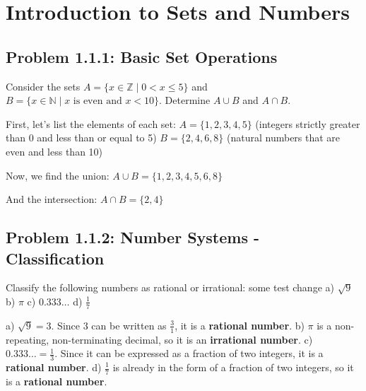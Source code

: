 
\section{Introduction to Sets and Numbers} %

\subsection*{Problem 1.1.1: Basic Set Operations}
Consider the sets $A = \{x \in \mathbb{Z} \mid 0 < x \le 5\}$ and $B = \{x \in \mathbb{N} \mid x \text{ is even and } x < 10\}$.
Determine $A \cup B$ and $A \cap B$.

\begin{solution}
First, let's list the elements of each set:
$A = \{1, 2, 3, 4, 5\}$ (integers strictly greater than 0 and less than or equal to 5)
$B = \{2, 4, 6, 8\}$ (natural numbers that are even and less than 10)

Now, we find the union:
$A \cup B = \{1, 2, 3, 4, 5, 6, 8\}$

And the intersection:
$A \cap B = \{2, 4\}$
\end{solution}

\subsection*{Problem 1.1.2: Number Systems - Classification}
Classify the following numbers as rational or irrational: some test change
a) $\sqrt{9}$
b) $\pi$
c) $0.333\dots$
d) $\frac{1}{7}$

\begin{solution}
a) $\sqrt{9} = 3$. Since $3$ can be written as $\frac{3}{1}$, it is a \textbf{rational number}.
b) $\pi$ is a non-repeating, non-terminating decimal, so it is an \textbf{irrational number}.
c) $0.333\dots = \frac{1}{3}$. Since it can be expressed as a fraction of two integers, it is a \textbf{rational number}.
d) $\frac{1}{7}$ is already in the form of a fraction of two integers, so it is a \textbf{rational number}.
\end{solution}

